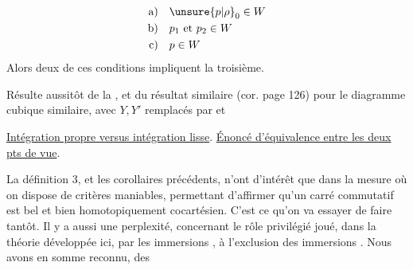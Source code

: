 \[
\begin{aligned}
\text{a)}\quad &\unsure{p|\rho}_0\in W\\
\text{b)}\quad &p_1\text{ et }p_2\in W\\
\text{c)}\quad &p\in W
\end{aligned}
\]
Alors deux de ces conditions impliquent la troisième.

Résulte aussitôt de la , et du résultat similaire (cor. page 126) pour le diagramme cubique similaire, avec $Y,Y'$ remplacés par
et

 \uline{Intégration propre versus intégration lisse}. \uline{Énoncé d'équivalence entre les deux pts de vue}.

La définition 3, et les corollaires précédents, n'ont d'intérêt que dans la mesure où on dispose de critères maniables, permettant d'affirmer qu'un carré commutatif est bel et bien homotopiquement cocartésien. C'est ce qu'on va essayer de faire tantôt. Il y a aussi une perplexité, concernant le rôle privilégié joué, dans la théorie développée ici, par les immersions , à l'exclusion des immersions . Nous avons en somme  reconnu, des
